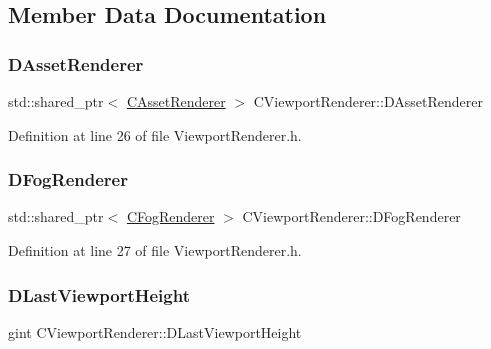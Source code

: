 \subsection{Member Data Documentation}
\hypertarget{classCViewportRenderer_a3daa075c87bbdde4d1ada41f0b98f4a8}{}\label{classCViewportRenderer_a3daa075c87bbdde4d1ada41f0b98f4a8} 
\subsubsection{\texorpdfstring{D\+Asset\+Renderer}{DAssetRenderer}}
{\footnotesize\ttfamily std\+::shared\+\_\+ptr$<$ \hyperlink{classCAssetRenderer}{C\+Asset\+Renderer} $>$ C\+Viewport\+Renderer\+::\+D\+Asset\+Renderer\hspace{0.3cm}{\ttfamily [protected]}}



Definition at line 26 of file Viewport\+Renderer.\+h.

\hypertarget{classCViewportRenderer_a2fa9d183d00bdba4a2fea6d946992608}{}\label{classCViewportRenderer_a2fa9d183d00bdba4a2fea6d946992608} 
\subsubsection{\texorpdfstring{D\+Fog\+Renderer}{DFogRenderer}}
{\footnotesize\ttfamily std\+::shared\+\_\+ptr$<$ \hyperlink{classCFogRenderer}{C\+Fog\+Renderer} $>$ C\+Viewport\+Renderer\+::\+D\+Fog\+Renderer\hspace{0.3cm}{\ttfamily [protected]}}



Definition at line 27 of file Viewport\+Renderer.\+h.

\hypertarget{classCViewportRenderer_aaca5c330615fc2aacc57dede8e7c18b0}{}\label{classCViewportRenderer_aaca5c330615fc2aacc57dede8e7c18b0} 
\subsubsection{\texorpdfstring{D\+Last\+Viewport\+Height}{DLastViewportHeight}}
{\footnotesize\ttfamily gint C\+Viewport\+Renderer\+::\+D\+Last\+Viewport\+Height\hspace{0.3cm}{\ttfamily [protected]}}




